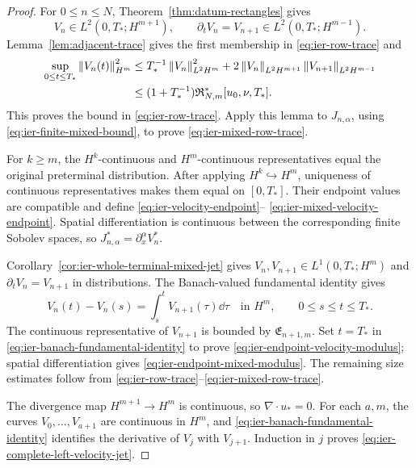 \begin{proof}
For \(0\le n\le N\), Theorem~\ref{thm:datum-rectangles} gives
\[
 V_n\in L^2(0,T_*;H^{m+1}),
 \qquad
 \partial_tV_n=V_{n+1}\in L^2(0,T_*;H^{m-1}).
\]
Lemma~\ref{lem:adjacent-trace} gives the first membership in
\eqref{eq:ier-row-trace} and
\begin{align*}
 \sup_{0\le t\le T_*}\left\lVert V_n(t)\right\rVert_{H^m}^2
 &\le T_*^{-1}\left\lVert V_n\right\rVert_{L^2H^m}^2
 +2\left\lVert V_n\right\rVert_{L^2H^{m+1}}\left\lVert V_{n+1}\right\rVert_{L^2H^{m-1}}\\
 &\le(1+T_*^{-1})\mathfrak R_{N,m}^*[u_0,\nu,T_*].
\end{align*}
This proves the bound in \eqref{eq:ier-row-trace}.  Apply this lemma to
\(J_{n,\alpha}\), using \eqref{eq:ier-finite-mixed-bound}, to prove
\eqref{eq:ier-mixed-row-trace}.

For \(k\ge m\), the \(H^k\)-continuous and \(H^m\)-continuous
representatives equal the original preterminal distribution.  After applying
\(H^k\hookrightarrow H^m\), uniqueness of continuous representatives makes
them equal on \([0,T_*]\).  Their endpoint values are compatible and define
\eqref{eq:ier-velocity-endpoint}--%
\eqref{eq:ier-mixed-velocity-endpoint}.  Spatial differentiation is
continuous between the corresponding finite Sobolev spaces, so
\(J_{n,\alpha}^*=\partial_x^\alpha V_n^*\).

Corollary~\ref{cor:ier-whole-terminal-mixed-jet} gives
\(V_n,V_{n+1}\in L^1(0,T_*;H^m)\) and
\(\partial_tV_n=V_{n+1}\) in distributions.  The Banach-valued fundamental
identity gives
\begin{equation}
 V_n(t)-V_n(s)=\int_s^tV_{n+1}(\tau)\dd\tau
 \quad\text{in }H^m,
 \qquad0\le s\le t\le T_*.
 \label{eq:ier-banach-fundamental-identity}
\end{equation}
The continuous representative of \(V_{n+1}\) is bounded by
\(\mathfrak E_{n+1,m}\).  Set \(t=T_*\) in
\eqref{eq:ier-banach-fundamental-identity} to prove
\eqref{eq:ier-endpoint-velocity-modulus}; spatial differentiation gives
\eqref{eq:ier-endpoint-mixed-modulus}.  The remaining size estimates follow
from \eqref{eq:ier-row-trace}--\eqref{eq:ier-mixed-row-trace}.

The divergence map \(H^{m+1}\to H^m\) is continuous, so
\(\nabla\cdot u_*=0\).  For each \(a,m\), the curves
\(V_0,\ldots,V_{a+1}\) are continuous in \(H^m\), and
\eqref{eq:ier-banach-fundamental-identity} identifies the derivative of
\(V_j\) with \(V_{j+1}\).  Induction in \(j\) proves
\eqref{eq:ier-complete-left-velocity-jet}.
\end{proof}

